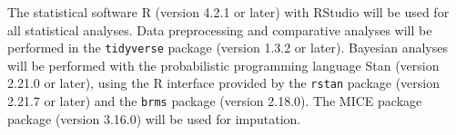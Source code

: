\documentclass{article}
\begin{document}
The statistical software R (version 4.2.1 or later) with RStudio will be used for all statistical analyses. Data preprocessing and comparative analyses will be performed in the \texttt{tidyverse} package (version 1.3.2 or later). Bayesian analyses will be performed with the probabilistic programming language Stan (version 2.21.0 or later), using the R interface provided by the \texttt{rstan} package (version 2.21.7 or later) and the \texttt{brms} package (version 2.18.0). The MICE package package (version 3.16.0) will be used for imputation.



\end{document}

